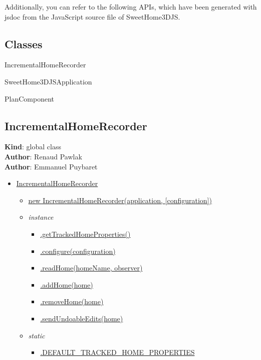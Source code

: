 \documentclass[a4paper]{report}
\providecommand{\tightlist}{%
  \setlength{\itemsep}{0pt}\setlength{\parskip}{0pt}}
\begin{document}
Additionally, you can refer to the following APIs, which have been generated with jsdoc from the JavaScript source file of SweetHome3DJS. 


\hypertarget{classes}{%
\subsection{Classes}\label{classes}}

IncrementalHomeRecorder

SweetHome3DJSApplication

PlanComponent

\hypertarget{incrementalhomerecorder}{%
\subsection{IncrementalHomeRecorder}\label{incrementalhomerecorder}}

\textbf{Kind}: global class\\
\textbf{Author}: Renaud Pawlak\\
\textbf{Author}: Emmanuel Puybaret

\begin{itemize}
\tightlist
\item
  \protect\hyperlink{IncrementalHomeRecorder}{IncrementalHomeRecorder}

  \begin{itemize}
  \tightlist
  \item
    \protect\hyperlink{new_IncrementalHomeRecorder_new}{new
    IncrementalHomeRecorder(application, {[}configuration{]})}
  \item
    \emph{instance}

    \begin{itemize}
    \tightlist
    \item
      \protect\hyperlink{IncrementalHomeRecorder+getTrackedHomeProperties}{.getTrackedHomeProperties()}
    \item
      \protect\hyperlink{IncrementalHomeRecorder+configure}{.configure(configuration)}
    \item
      \protect\hyperlink{IncrementalHomeRecorder+readHome}{.readHome(homeName,
      observer)}
    \item
      \protect\hyperlink{IncrementalHomeRecorder+addHome}{.addHome(home)}
    \item
      \protect\hyperlink{IncrementalHomeRecorder+removeHome}{.removeHome(home)}
    \item
      \protect\hyperlink{IncrementalHomeRecorder+sendUndoableEdits}{.sendUndoableEdits(home)}
    \end{itemize}
  \item
    \emph{static}

    \begin{itemize}
    \tightlist
    \item
      \protect\hyperlink{IncrementalHomeRecorder.DEFAULT_TRACKED_HOME_PROPERTIES}{.DEFAULT\_TRACKED\_HOME\_PROPERTIES}
    \end{itemize}
  \end{itemize}
\end{itemize}
\end{document}
